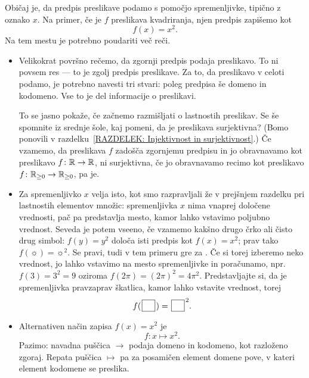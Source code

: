                 Običaj je, da predpis preslikave podamo s pomočjo spremenljivke, tipično z oznako $x$. Na primer, če je $f$ preslikava kvadriranja, njen predpis zapišemo kot
                \[f(x) = x^2.\]
                Na tem mestu je potrebno poudariti več reči.
                \begin{itemize}
                        \item
                                Velikokrat površno rečemo, da zgornji predpis podaja preslikavo. To ni povsem res --- to je zgolj predpis preslikave. Za to, da preslikavo v celoti podamo, je potrebno navesti tri stvari: poleg predpisa še domeno in kodomeno. Vse to je del informacije o preslikavi.

                                To se jasno pokaže, če začnemo razmišljati o lastnostih preslikav. Se še spomnite iz srednje šole, kaj pomeni, da je preslikava surjektivna? (Bomo ponovili v razdelku~\ref{RAZDELEK: Injektivnost in surjektivnost}.) Če vzamemo, da preslikava $f$ zadošča zgornjemu predpisu in jo obravnavamo kot preslikavo $f\colon \mathbb{R} \to \mathbb{R}$, ni surjektivna, če jo obravnavamo recimo kot preslikavo $f\colon \mathbb{R}_{\geq 0} \to \mathbb{R}_{\geq 0}$, pa je.
                        \item
                                Za spremenljivko $x$ velja isto, kot smo razpravljali že v prejšnjem razdelku pri lastnostih elementov množic: spremenljivka $x$ nima vnaprej določene vrednosti, pač pa predstavlja mesto, kamor lahko vstavimo poljubno vrednost. Seveda je potem vseeno, če vzamemo kakšno drugo črko ali čisto drug simbol: $f(y) = y^2$ določa isti predpis kot $f(x) = x^2$; prav tako $f(\sun) = \sun^2$. Se pravi, tudi v tem primeru gre za . Če si torej izberemo neko vrednost, jo lahko vstavimo na mesto spremenljivke in poračunamo, npr.~$f(3) = 3^2 = 9$ oziroma $f(2\pi) = (2\pi)^2 = 4\pi^2$. Predstavljajte si, da je spremenljivka pravzaprav škatlica, kamor lahko vstavite vrednost, torej
                                \[f(\argbox) = \argbox^2.\]
                        \item
                                Alternativen način zapisa $f(x) = x^2$ je
                                \[f\colon x \mapsto x^2.\]
                                Pazimo: navadna puščica $\to$ podaja domeno in kodomeno, kot razloženo zgoraj. Repata puščica $\mapsto$ pa za posamičen element domene pove, v kateri element kodomene se preslika.


\end{itemize}
